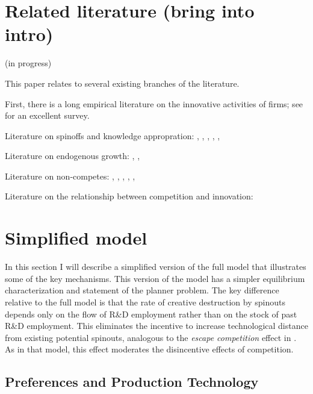 \documentclass[11pt,english]{article}
\theoremstyle{remark}
\begin{document}
\section{Related literature (bring into intro)}\label{related_literature}

(in progress)

This paper relates to several existing branches of the literature. 

First, there is a long empirical literature on the innovative activities of firms; see \cite{cohen_fifty_2010} for an excellent survey.

Literature on spinoffs and knowledge appropration: \cite{anton_expropriation_1994}, \cite{anton_start-ups_1995}, \cite{franco_covenants_2008}, \cite{klepper_entry_2005}, \cite{klette_innovating_2004}, \cite{chatterjee_spinoffs_2012}

Literature on endogenous growth: \cite{grossman_quality_1991}, \cite{romer_increasing_1986}, \cite{aghion_model_1992}

Literature on non-competes: \cite{saxenian_regional_1994}, \cite{gilson_legal_1999}, \cite{jeffers_impact_2018}, \cite{marx_mobility_2009}, \cite{marx_regional_2015}, \cite{starr_noncompetes_2019}

Literature on the relationship between competition and innovation: \cite{aghion_competition_2005}

\section{Simplified model}\label{simplified_model}

In this section I will describe a simplified version of the full model that illustrates some of the key mechanisms. This version of the model has a simpler equilibrium characterization and statement of the planner problem. The key difference relative to the full model is that the rate of creative destruction by spinouts depends only on the flow of R\&D employment rather than on the stock of past R\&D employment. This eliminates the incentive to increase technological distance from existing potential spinouts, analogous to the \textit{escape competition} effect in \cite{aghion_competition_2005}. As in that model, this effect moderates the disincentive effects of competition.

\subsection{Preferences and Production Technology}
\end{document}
